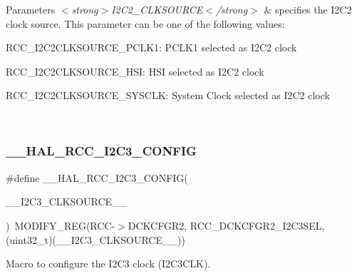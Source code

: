 \begin{DoxyParams}{Parameters}
{\em $<$strong$>$\+I2\+C2\+\_\+\+C\+L\+K\+S\+O\+U\+R\+C\+E$<$/strong$>$} & specifies the I2\+C2 clock source. This parameter can be one of the following values\+: \begin{DoxyItemize}
\item R\+C\+C\+\_\+\+I2\+C2\+C\+L\+K\+S\+O\+U\+R\+C\+E\+\_\+\+P\+C\+L\+K1\+: P\+C\+L\+K1 selected as I2\+C2 clock \item R\+C\+C\+\_\+\+I2\+C2\+C\+L\+K\+S\+O\+U\+R\+C\+E\+\_\+\+H\+SI\+: H\+SI selected as I2\+C2 clock \item R\+C\+C\+\_\+\+I2\+C2\+C\+L\+K\+S\+O\+U\+R\+C\+E\+\_\+\+S\+Y\+S\+C\+LK\+: System Clock selected as I2\+C2 clock \end{DoxyItemize}
\\
\hline
\end{DoxyParams}
\mbox{\label{group___r_c_c_ex___exported___macros_ga2ca9240d0a7d79ca5f72b298255e73ee}} 
\subsubsection{\texorpdfstring{\_\_HAL\_RCC\_I2C3\_CONFIG}{\_\_HAL\_RCC\_I2C3\_CONFIG}}
{\footnotesize\ttfamily \#define \+\_\+\+\_\+\+H\+A\+L\+\_\+\+R\+C\+C\+\_\+\+I2\+C3\+\_\+\+C\+O\+N\+F\+IG(\begin{DoxyParamCaption}\item[{}]{\+\_\+\+\_\+\+I2\+C3\+\_\+\+C\+L\+K\+S\+O\+U\+R\+C\+E\+\_\+\+\_\+ }\end{DoxyParamCaption})~M\+O\+D\+I\+F\+Y\+\_\+\+R\+EG(R\+CC-\/$>$D\+C\+K\+C\+F\+G\+R2, R\+C\+C\+\_\+\+D\+C\+K\+C\+F\+G\+R2\+\_\+\+I2\+C3\+S\+EL, (uint32\+\_\+t)(\+\_\+\+\_\+\+I2\+C3\+\_\+\+C\+L\+K\+S\+O\+U\+R\+C\+E\+\_\+\+\_\+))}



Macro to configure the I2\+C3 clock (I2\+C3\+C\+LK). 


